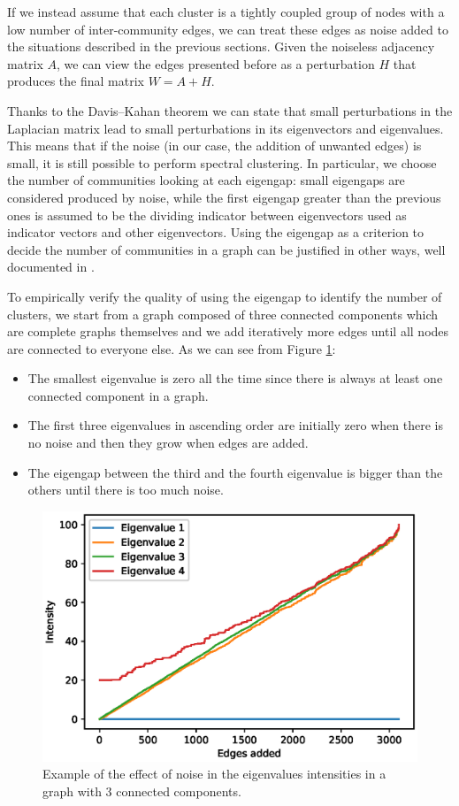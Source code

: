 \documentclass{article}
\begin{document}
If we instead assume that each cluster is a tightly coupled group of nodes
with a low number of inter-community edges, we can treat these edges as noise added
to the situations described in the previous sections.
Given the noiseless adjacency matrix $A$,
we can view the edges presented before as a perturbation $H$ that produces the final
matrix $W = A + H$.

Thanks to the Davis–Kahan theorem \cite{davis1970rotation} we can state that small perturbations
in the Laplacian matrix lead to small perturbations in its eigenvectors and eigenvalues.
This means that if the noise (in our case, the addition of unwanted edges) is small,
it is still possible to perform spectral clustering.
In particular, we choose the number of communities looking at each eigengap:
small eigengaps are considered produced by noise,
while the first eigengap greater than the previous ones is assumed to be the dividing
indicator between eigenvectors used as indicator vectors and other eigenvectors.
Using the eigengap as a criterion to decide the number of communities in a graph
can be justified in other ways, well documented in \cite{DBLP:journals/corr/abs-0711-0189}.

To empirically verify the quality of using the eigengap to identify the number of clusters,
we start from a graph composed of three connected components which are complete graphs themselves and
we add iteratively more edges until all nodes are connected to everyone else.
As we can see from Figure \ref{figure:addingnoise}:
\begin{itemize}
    \item The smallest eigenvalue is zero all the time since there is always at least one connected component in a graph.
    \item The first three eigenvalues in ascending order are initially zero when there is no noise and then they grow when edges are added.
    \item The eigengap between the third and the fourth eigenvalue is bigger than the others until there is too much noise.
\end{itemize}

\begin{figure}[ht]
    \centering
    \includegraphics[width=0.5\linewidth]{figures/adding-noise.eps}
    \caption{Example of the effect of noise in the eigenvalues intensities in a graph with 3 connected components.}
    \label{figure:addingnoise}
\end{figure}
\end{document}
